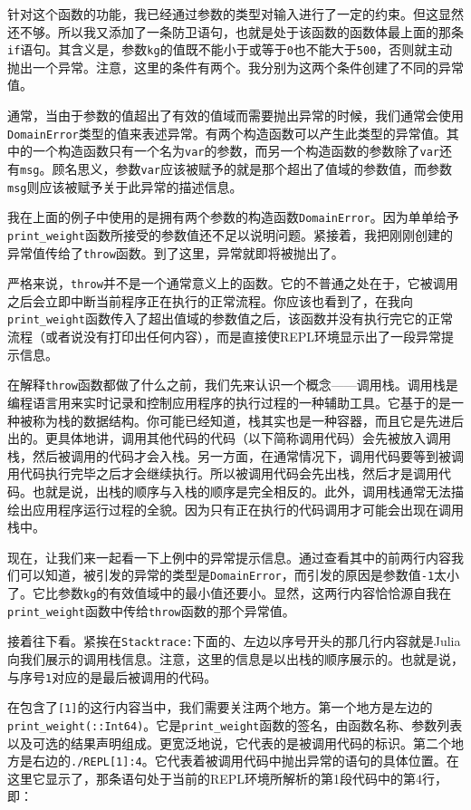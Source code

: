 针对这个函数的功能，我已经通过参数的类型对输入进行了一定的约束。但这显然还不够。所以我又添加了一条防卫语句，也就是处于该函数的函数体最上面的那条\verb`if`语句。其含义是，参数\verb`kg`的值既不能小于或等于\verb`0`也不能大于\verb`500`，否则就主动抛出一个异常。注意，这里的条件有两个。我分别为这两个条件创建了不同的异常值。

通常，当由于参数的值超出了有效的值域而需要抛出异常的时候，我们通常会使用\verb`DomainError`类型的值来表述异常。有两个构造函数可以产生此类型的异常值。其中的一个构造函数只有一个名为\verb`var`的参数，而另一个构造函数的参数除了\verb`var`还有\verb`msg`。顾名思义，参数\verb`var`应该被赋予的就是那个超出了值域的参数值，而参数\verb`msg`则应该被赋予关于此异常的描述信息。

我在上面的例子中使用的是拥有两个参数的构造函数\verb`DomainError`。因为单单给予\verb`print_weight`函数所接受的参数值还不足以说明问题。紧接着，我把刚刚创建的异常值传给了\verb`throw`函数。到了这里，异常就即将被抛出了。

严格来说，\verb`throw`并不是一个通常意义上的函数。它的不普通之处在于，它被调用之后会立即中断当前程序正在执行的正常流程。你应该也看到了，在我向\verb`print_weight`函数传入了超出值域的参数值之后，该函数并没有执行完它的正常流程（或者说没有打印出任何内容），而是直接使REPL环境显示出了一段异常提示信息。

在解释\verb`throw`函数都做了什么之前，我们先来认识一个概念——调用栈。调用栈是编程语言用来实时记录和控制应用程序的执行过程的一种辅助工具。它基于的是一种被称为栈的数据结构。你可能已经知道，栈其实也是一种容器，而且它是先进后出的。更具体地讲，调用其他代码的代码（以下简称调用代码）会先被放入调用栈，然后被调用的代码才会入栈。另一方面，在通常情况下，调用代码要等到被调用代码执行完毕之后才会继续执行。所以被调用代码会先出栈，然后才是调用代码。也就是说，出栈的顺序与入栈的顺序是完全相反的。此外，调用栈通常无法描绘出应用程序运行过程的全貌。因为只有正在执行的代码调用才可能会出现在调用栈中。

现在，让我们来一起看一下上例中的异常提示信息。通过查看其中的前两行内容我们可以知道，被引发的异常的类型是\verb`DomainError`，而引发的原因是参数值\verb`-1`太小了。它比参数\verb`kg`的有效值域中的最小值还要小。显然，这两行内容恰恰源自我在\verb`print_weight`函数中传给\verb`throw`函数的那个异常值。

接着往下看。紧挨在\verb`Stacktrace:`下面的、左边以序号开头的那几行内容就是Julia向我们展示的调用栈信息。注意，这里的信息是以出栈的顺序展示的。也就是说，与序号\verb`1`对应的是最后被调用的代码。

在包含了\verb`[1]`的这行内容当中，我们需要关注两个地方。第一个地方是左边的\verb`print_weight(::Int64)`。它是\verb`print_weight`函数的签名，由函数名称、参数列表以及可选的结果声明组成。更宽泛地说，它代表的是被调用代码的标识。第二个地方是右边的\verb`./REPL[1]:4`。它代表着被调用代码中抛出异常的语句的具体位置。在这里它显示了，那条语句处于当前的REPL环境所解析的第1段代码中的第4行，即：

